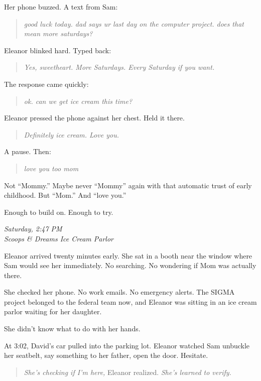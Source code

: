 \scenebreak

Her phone buzzed. A text from Sam:

\begin{quote}
\emph{good luck today. dad says ur last day on the computer project. does that mean more saturdays?}
\end{quote}

Eleanor blinked hard. Typed back:

\begin{quote}
\emph{Yes, sweetheart. More Saturdays. Every Saturday if you want.}
\end{quote}

The response came quickly:

\begin{quote}
\emph{ok. can we get ice cream this time?}
\end{quote}

Eleanor pressed the phone against her chest. Held it there.

\begin{quote}
\emph{Definitely ice cream. Love you.}
\end{quote}

A pause. Then:

\begin{quote}
\emph{love you too mom}
\end{quote}

Not ``Mommy.'' Maybe never ``Mommy'' again with that automatic trust of early childhood. But ``Mom.'' And ``love you.''

Enough to build on. Enough to try.

\scenebreak

\emph{Saturday, 2:47 PM\\
Scoops \& Dreams Ice Cream Parlor}

Eleanor arrived twenty minutes early. She sat in a booth near the window where Sam would see her immediately. No searching. No wondering if Mom was actually there.

She checked her phone. No work emails. No emergency alerts. The SIGMA project belonged to the federal team now, and Eleanor was sitting in an ice cream parlor waiting for her daughter.

She didn't know what to do with her hands.

At 3:02, David's car pulled into the parking lot. Eleanor watched Sam unbuckle her seatbelt, say something to her father, open the door. Hesitate.

\begin{quote}
\emph{She's checking if I'm here,} Eleanor realized. \emph{She's learned to verify.}
\end{quote}

